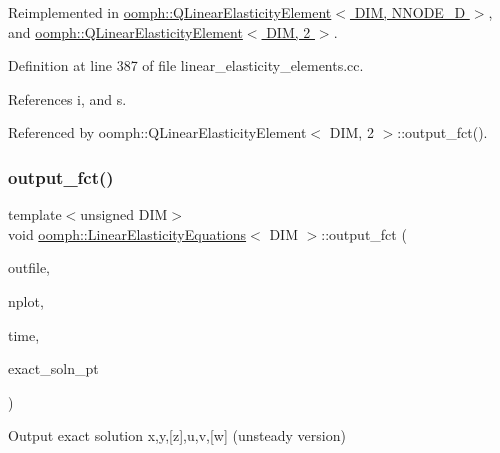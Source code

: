 Reimplemented in \hyperlink{classoomph_1_1QLinearElasticityElement_a6f391511c442ee1ead6260df2e559c7e}{oomph\+::\+Q\+Linear\+Elasticity\+Element$<$ D\+I\+M, N\+N\+O\+D\+E\+\_\+D $>$}, and \hyperlink{classoomph_1_1QLinearElasticityElement_a6f391511c442ee1ead6260df2e559c7e}{oomph\+::\+Q\+Linear\+Elasticity\+Element$<$ D\+I\+M, 2 $>$}.



Definition at line 387 of file linear\+\_\+elasticity\+\_\+elements.\+cc.



References i, and s.



Referenced by oomph\+::\+Q\+Linear\+Elasticity\+Element$<$ D\+I\+M, 2 $>$\+::output\+\_\+fct().

\mbox{\label{classoomph_1_1LinearElasticityEquations_af11315d53dcb1e8fe39aef29ccab504a}} 
\subsubsection{\texorpdfstring{output\+\_\+fct()}{output\_fct()}\hspace{0.1cm}{\footnotesize\ttfamily [2/2]}}
{\footnotesize\ttfamily template$<$unsigned D\+IM$>$ \\
void \hyperlink{classoomph_1_1LinearElasticityEquations}{oomph\+::\+Linear\+Elasticity\+Equations}$<$ D\+IM $>$\+::output\+\_\+fct (\begin{DoxyParamCaption}\item[{std\+::ostream \&}]{outfile,  }\item[{const unsigned \&}]{nplot,  }\item[{const double \&}]{time,  }\item[{\hyperlink{classoomph_1_1FiniteElement_ad4ecf2b61b158a4b4d351a60d23c633e}{Finite\+Element\+::\+Unsteady\+Exact\+Solution\+Fct\+Pt}}]{exact\+\_\+soln\+\_\+pt }\end{DoxyParamCaption})\hspace{0.3cm}{\ttfamily [virtual]}}



Output exact solution x,y,\mbox{[}z\mbox{]},u,v,\mbox{[}w\mbox{]} (unsteady version) 



